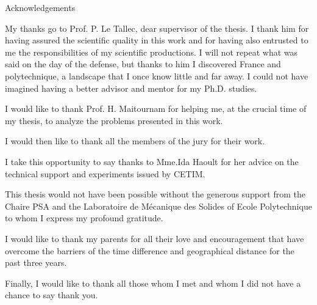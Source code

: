 \begin{center}
  \large Acknowledgements
\end{center}

My thanks go to Prof. P. Le Tallec, dear supervisor of the thesis. I thank him for having assured the scientific quality in this work and for having also entrusted to me the responsibilities of my scientific productions. I will not repeat what was said on the day of the defense, but thanks to him I discovered France and polytechnique, a landscape that I once know little and far away. I could not have imagined having a better advisor and mentor for my Ph.D. studies.

I would like to thank Prof. H. Maitournam for helping me, at the crucial time of my thesis, to analyze the problems presented in this work.

I would then like to thank all the members of the jury for their work.


I take this opportunity to say thanks to Mme.Ida Haoult for her advice on the technical support and experiments issued by CETIM.

This thesis would not have been possible without the generous support from the Chaire PSA and the Laboratoire de Mécanique des Solides of Ecole Polytechnique to whom I express my profound gratitude.

	I would like to thank my parents for all their love and
	encouragement that have overcome the barriers of the time difference and
	geographical distance for the past three years.

Finally, I would like to thank all those whom I met and whom I did not have a chance to say thank you.
